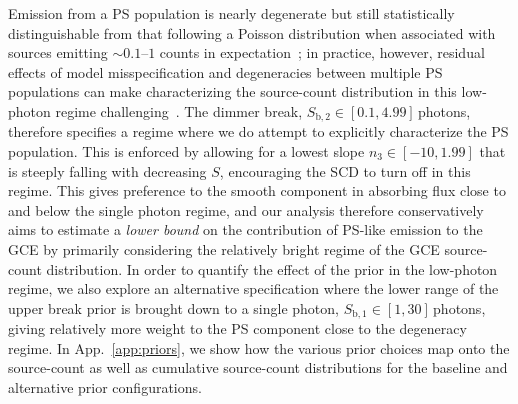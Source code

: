 \documentclass[prd,aps,10pt,nofootinbib,twocolumn,superscriptaddress,preprintnumbers,balancelastpage,longbibliography]{revtex4-1}
\begin{document}
Emission from a PS population is nearly degenerate but still statistically distinguishable from that following a Poisson distribution when associated with sources emitting $\sim 0.1$--$1$ counts in expectation~\cite{List:2021aer}; in practice, however, residual effects of model misspecification and degeneracies between multiple PS populations can make characterizing the source-count distribution in this low-photon regime challenging~\cite{Chang:2019ars}. The dimmer break, $S_{\mathrm{b}, 2} \in  [0.1, 4.99]$\,photons, therefore specifies a regime where we do attempt to explicitly characterize the PS population. This is enforced by allowing for a lowest slope $n_3 \in [-10, 1.99]$ that is steeply falling with decreasing $S$, encouraging the SCD to turn off in this regime. This gives preference to the smooth component in absorbing flux close to and below the single photon regime, and our analysis therefore conservatively aims to estimate a \emph{lower bound} on the contribution of PS-like emission to the GCE by primarily considering the relatively bright regime of the GCE source-count distribution. In order to quantify the effect of the prior in the low-photon regime, we also explore an alternative specification where the lower range of the upper break prior is brought down to a single photon, $S_{\mathrm{b}, 1}  \in  [1, 30]$\,photons, giving relatively more weight to the PS component close to the degeneracy regime. In App.~\ref{app:priors}, we show how the various prior choices map onto the source-count as well as cumulative source-count distributions for the baseline and alternative prior configurations.
\end{document}

